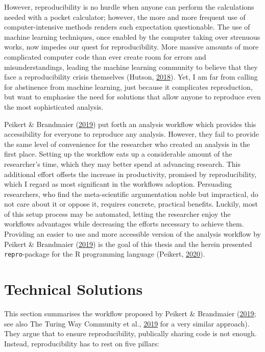 \documentclass[12pt,a4paper,]{article}
\begin{document}
However, reproducibility is no hurdle when anyone can perform the calculations needed with a pocket calculator; however, the more and more frequent use of computer-intensive methods renders such expectation questionable.
The use of machine learning techniques, once enabled by the computer taking over strenuous works, now impedes our quest for reproducibility.
More massive amounts of more complicated computer code than ever create room for errors and misunderstandings, leading the machine learning community to believe that they face a reproducibility crisis themselves (Hutson, \protect\hyperlink{ref-hutsonArtificialIntelligenceFaces2018}{2018}).
Yet, I am far from calling for abstinence from machine learning, just because it complicates reproduction, but want to emphasise the need for solutions that allow anyone to reproduce even the most sophisticated analysis.

Peikert \& Brandmaier (\protect\hyperlink{ref-peikertReproducibleDataAnalysis2019}{2019}) put forth an analysis workflow which provides this accessibility for everyone to reproduce any analysis.
However, they fail to provide the same level of convenience for the researcher who created an analysis in the first place.
Setting up the workflow eats up a considerable amount of the researcher's time, which they may better spend at advancing research.
This additional effort offsets the increase in productivity, promised by reproducibility, which I regard as most significant in the workflows adoption.
Persuading researchers, who find the meta-scientific argumentation noble but impractical, do not care about it or oppose it, requires concrete, practical benefits.
Luckily, most of this setup process may be automated, letting the researcher enjoy the workflows advantages while decreasing the efforts necessary to achieve them.
Providing an easier to use and more accessible version of the analysis workflow by Peikert \& Brandmaier (\protect\hyperlink{ref-peikertReproducibleDataAnalysis2019}{2019}) is the goal of this thesis and the herein presented \texttt{repro}-package for the R programming language (Peikert, \protect\hyperlink{ref-R-repro}{2020}).

\hypertarget{technical-solutions}{%
\section{Technical Solutions}\label{technical-solutions}}

This section summarises the workflow proposed by Peikert \& Brandmaier (\protect\hyperlink{ref-peikertReproducibleDataAnalysis2019}{2019}; see also The Turing Way Community et al., \protect\hyperlink{ref-theturingwaycommunityTuringWayHandbook2019}{2019} for a very similar approach).
They argue that to ensure reproducibility, publically sharing code is not enough.
Instead, reproducibility has to rest on five pillars:
\end{document}
